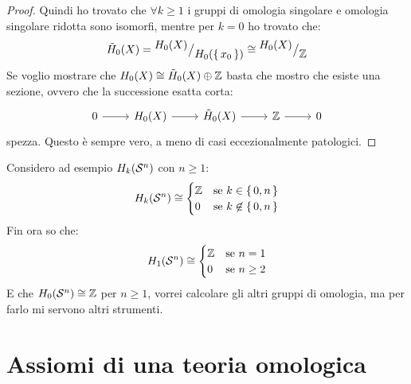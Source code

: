 \begin{proof}
  Quindi ho trovato che $ \forall k \geq 1 $ i gruppi di omologia singolare e omologia singolare ridotta
  sono isomorfi, mentre per $ k = 0 $ ho trovato che:
  \[
    \tilde{H}_0(X) = {^{\textstyle H_0(X)}\big/_{\textstyle H_0(\set{x_0})}} \cong  {^{\textstyle H_0(X)}\big/_{\textstyle \mathbb{Z}}}
  \]
  Se voglio mostrare che $ H_0(X) \cong \tilde{H}_0(X) \oplus \mathbb{Z} $ basta che mostro che esiste una sezione,
  ovvero che la successione esatta corta:
  \[
    \begin{tikzcd}
      0 \rar & H_0(X) \rar & \tilde{H}_0(X) \rar & \Z \rar & 0
    \end{tikzcd}
  \]
  spezza. Questo è sempre vero, a meno di casi eccezionalmente patologici.
\end{proof}

\begin{example}
  Considero ad esempio $ H_k(\mathcal{S}^{n}) $ con $ n \geq 1 $:
  \[
    H_k(\mathcal{S}^{n}) \cong
    \begin{cases}
      \mathbb{Z} & \text{se } k \in \set{0,n} \\
      0 & \text{se } k \not \in \set{0,n}
    \end{cases}
  \]
  Fin ora so che:
  \[
    H_1(\mathcal{S}^{n}) \cong
    \begin{cases}
      \mathbb{Z} & \text{se } n = 1 \\
      0 & \text{se } n \geq 2
    \end{cases}
  \]
  E che $ H_0(\mathcal{S}^{n}) \cong \mathbb{Z} $ per $ n \geq 1 $, vorrei calcolare gli altri gruppi di omologia,
  ma per farlo mi servono altri strumenti.
\end{example}

\section{Assiomi di una teoria omologica}

